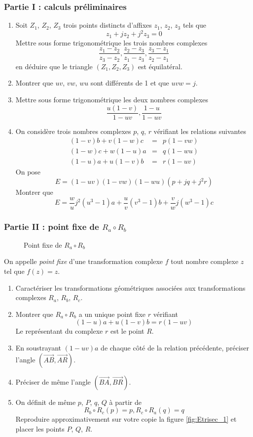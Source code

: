 \subsubsection*{Partie I : calculs pr{\'e}liminaires}
\begin{enumerate}
  \item Soit $Z_1$, $Z_2$, $Z_3$ trois points distincts d'affixes
  $z_1$, $z_2$, $z_3$ tels que
  \[z_1+jz_2+j^2z_3=0\]
  Mettre sous forme trigonom{\'e}trique les trois nombres complexes
  \[\frac{z_1-z_2}{z_3-z_2},\frac{z_2-z_3}{z_1-z_3},\frac{z_3-z_1}{z_2-z_1}\]
  en d{\'e}duire que le triangle $(Z_1,Z_2,Z_3)$ est {\'e}quilat{\'e}ral.
  \item Montrer que $uv$, $vw$, $wu$ sont diff{\'e}rents de 1 et que
  $uvw=j$.
  \item Mettre sous forme trigonom{\'e}trique les deux nombres
  complexes
  \[\frac{u(1-v)}{1-uv},\frac{1-u}{1-uv}\]
  \item On consid{\`e}re trois nombres complexes $p$, $q$, $r$
  v{\'e}rifiant les relations suivantes
  \begin{eqnarray*}
  (1-v)b+v(1-w)c &=& p(1-vw)\\
  (1-w)c+w(1-u)a &=& q(1-wu)\\
  (1-u)a+u(1-v)b &=& r(1-uv)
  \end{eqnarray*}
  On pose
  \[E=(1-uv)(1-vw)(1-wu)(p+jq+j^2r)\]
  Montrer que
  \[E=\frac{w}{u}j^2(u^3-1)a+\frac{u}{v}(v^3-1)b+\frac{v}{w}j(w^3-1)c\]
\end{enumerate}

\subsubsection*{Partie II : point fixe de $R_a \circ R_b$}
\begin{figure}[ht]
  \centering
  
  \caption{Point fixe de $R_a \circ R_b$}
  \label{fig:Etrisec_3}
\end{figure}

On appelle \emph{point fixe} d'une transformation complexe $f$
tout nombre complexe $z$ tel que $f(z)=z$.
\begin{enumerate}
  \item Caract{\'e}riser les transformations g{\'e}om{\'e}triques associ{\'e}es aux transformations complexes $R_a$, $R_b$, $R_c$.
  \item Montrer que $R_a \circ R_b$ a un unique point fixe $r$  v{\'e}rifiant
  \[(1-u)a+u(1-v)b = r(1-uv)\]
  Le repr{\'e}sentant du complexe $r$ est le point $R$.
  \item En soustrayant $(1-uv)a$ de chaque c{\^o}t{\'e} de la relation pr{\'e}c{\'e}dente, pr{\'e}ciser l'angle $(\overrightarrow{AB},\overrightarrow{AR})$.
  \item Pr{\'e}ciser de m{\^e}me l'angle $(\overrightarrow{BA},\overrightarrow{BR})$.
  \item On d{\'e}finit de m{\^e}me $p$, $P$, $q$, $Q$ {\`a} partir de
  \[R_b \circ R_c(p)=p,R_c \circ R_a(q)=q\]
  Reproduire approximativement sur votre copie la figure \ref{fig:Etrisec_1} et placer les points $P$, $Q$, $R$.
\end{enumerate}

